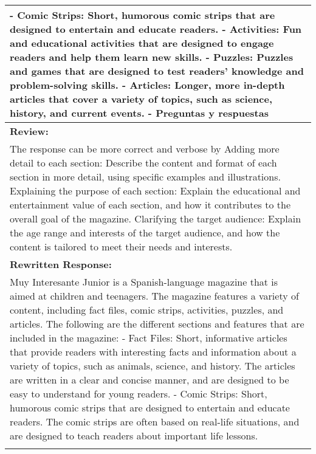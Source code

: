 \begin{table*}[t]
\begin{tabular}{p{}}
- Comic Strips: Short, humorous comic strips that are designed to entertain and educate readers.\newline
- Activities: Fun and educational activities that are designed to engage readers and help them learn new skills.\newline
- Puzzles: Puzzles and games that are designed to test readers' knowledge and problem-solving skills.\newline
- Articles: Longer, more in-depth articles that cover a variety of topics, such as science, history, and current events.\newline
- Preguntas y respuestas \\
\hline
\textbf{Review:} \\
The response can be more correct and verbose by\newline
Adding more detail to each section: Describe the content and format of each section in more detail, using specific examples and illustrations.\newline
Explaining the purpose of each section: Explain the educational and entertainment value of each section, and how it contributes to the overall goal of the magazine.\newline
Clarifying the target audience: Explain the age range and interests of the target audience, and how the content is tailored to meet their needs and interests. \\
\hline
\textbf{Rewritten Response:} \\
Muy Interesante Junior is a Spanish-language magazine that is aimed at children and teenagers. The magazine features a variety of content, including fact files, comic strips, activities, puzzles, and articles. The following are the different sections and features that are included in the magazine:\newline
- Fact Files: Short, informative articles that provide readers with interesting facts and information about a variety of topics, such as animals, science, and history. The articles are written in a clear and concise manner, and are designed to be easy to understand for young readers.\newline
- Comic Strips: Short, humorous comic strips that are designed to entertain and educate readers. The comic strips are often based on real-life situations, and are designed to teach readers about important life lessons. \\
\Xhline{1.5pt}
\end{tabular}
\end{table*}

